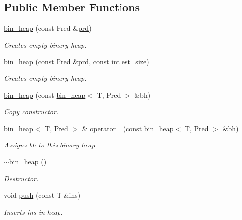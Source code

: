 \subsection*{Public Member Functions}
\begin{DoxyCompactItemize}
\item 
\mbox{\hyperlink{classbin__heap_a9de42b60fac4b0d38aa738522eb7c4cd}{bin\+\_\+heap}} (const Pred \&\mbox{\hyperlink{classbin__heap_a5ecc420dfd03a6a0b4c9328cac1fae14}{prd}})
\begin{DoxyCompactList}\small\item\em Creates empty binary heap. \end{DoxyCompactList}\item 
\mbox{\hyperlink{classbin__heap_ab911dd559d9d9fd665b9fdf2d8202bb8}{bin\+\_\+heap}} (const Pred \&\mbox{\hyperlink{classbin__heap_a5ecc420dfd03a6a0b4c9328cac1fae14}{prd}}, const int est\+\_\+size)
\begin{DoxyCompactList}\small\item\em Creates empty binary heap. \end{DoxyCompactList}\item 
\mbox{\hyperlink{classbin__heap_a19bd4241e097852ffda83b72557ffbdc}{bin\+\_\+heap}} (const \mbox{\hyperlink{classbin__heap}{bin\+\_\+heap}}$<$ T, Pred $>$ \&bh)
\begin{DoxyCompactList}\small\item\em Copy constructor. \end{DoxyCompactList}\item 
\mbox{\hyperlink{classbin__heap}{bin\+\_\+heap}}$<$ T, Pred $>$ \& \mbox{\hyperlink{classbin__heap_ad31b6806316a272686015fcbf5f633cd}{operator=}} (const \mbox{\hyperlink{classbin__heap}{bin\+\_\+heap}}$<$ T, Pred $>$ \&bh)
\begin{DoxyCompactList}\small\item\em Assigns {\ttfamily bh} to this binary heap. \end{DoxyCompactList}\item 
\mbox{\hyperlink{classbin__heap_a5283db56783a84ee28dea9d393acf905}{$\sim$bin\+\_\+heap}} ()
\begin{DoxyCompactList}\small\item\em Destructor. \end{DoxyCompactList}\item 
void \mbox{\hyperlink{classbin__heap_a6d658d61533e66cf83dce2f8e35bed17}{push}} (const T \&ins)
\begin{DoxyCompactList}\small\item\em Inserts {\ttfamily ins} in heap. \end{DoxyCompactList}\item 

\end{DoxyCompactItemize}
